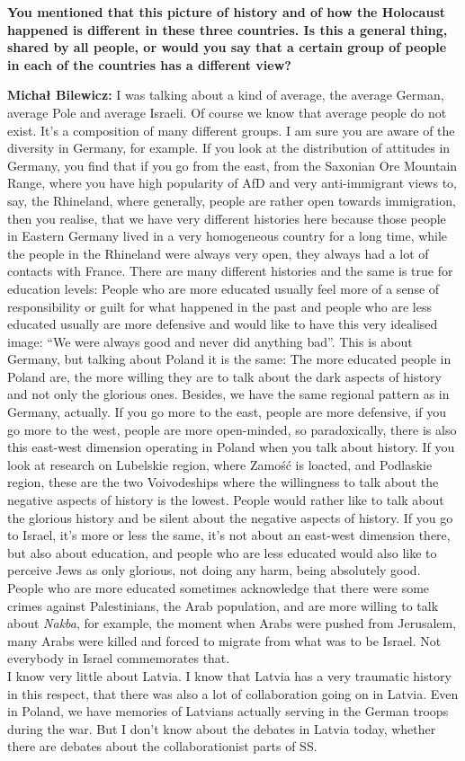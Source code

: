 \textbf{You mentioned that this picture of history and of how the Holocaust happened is different in these three countries. Is this a general thing, shared by all people, or would you say that a certain group of people in each of the countries has a different view?}

\textbf{Michał Bilewicz:} I was talking about a kind of average, the average German, average Pole and average Israeli. Of course we know that average people do not exist. It's a composition of many different groups. I am sure you are aware of the diversity in Germany, for example. If you look at the distribution of attitudes in Germany, you find that if you go from the east, from the Saxonian Ore Mountain Range, where you have high popularity of AfD and very anti-immigrant views to, say, the Rhineland, where generally, people are rather open towards immigration, then you realise, that we have very different histories here because those people in Eastern Germany lived in a very homogeneous country for a long time, while the people in the Rhineland were always very open, they always had a lot of contacts with France. There are many different histories and the same is true for education levels: People who are more educated usually feel more of a sense of responsibility or guilt for what happened in the past and people who are less educated usually are more defensive and would like to have this very idealised image: ``We were always good and never did anything bad''. This is about Germany, but talking about Poland it is the same: The more educated people in Poland are, the more willing they are to talk about the dark aspects of history and not only the glorious ones. Besides, we have the same regional pattern as in Germany, actually. If you go more to the east, people are more defensive, if you go more to the west, people are more open-minded, so paradoxically, there is also this east-west dimension operating in Poland when you talk about history. If you look at research on Lubelskie region, where Zamość is loacted, and Podlaskie region, these are the two Voivodeships where the willingness to talk about the negative aspects of history is the lowest. People would rather like to talk about the glorious history and be silent about the negative aspects of history. If you go to Israel, it's more or less the same, it's not about an east-west dimension there, but also about education, and people who are less educated would also like to perceive Jews as only glorious, not doing any harm, being absolutely good. People who are more educated sometimes acknowledge that there were some crimes against Palestinians, the Arab population, and are more willing to talk about \textit{Nakba}, for example, the moment when Arabs were pushed from Jerusalem, many Arabs were killed and forced to migrate from what was to be Israel. Not everybody in Israel commemorates that.\\
I know very little about Latvia. I know that Latvia has a very traumatic history in this respect, that there was also a lot of collaboration going on in Latvia. Even in Poland, we have memories of Latvians actually serving in the German troops during the war. But I don't know about the debates in Latvia today, whether there are debates about the collaborationist parts of SS. 

